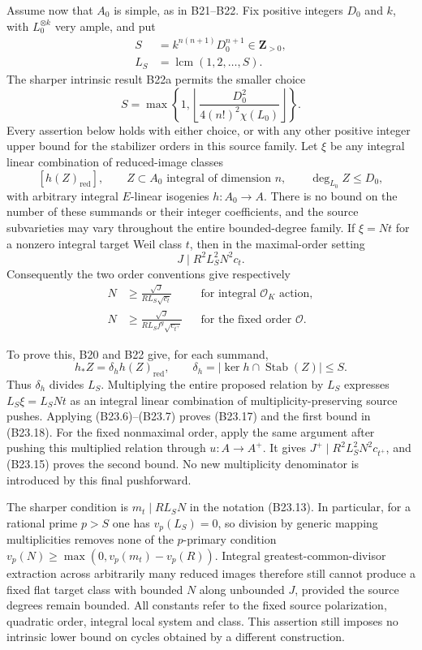 Assume now that \(A_0\) is simple, as in B21--B22. Fix positive integers \(D_0\) and \(k\), with \(L_0^{\otimes k}\) very ample, and put \[
 \begin{aligned}
 S&=k^{n(n+1)}D_0^{n+1}\in\mathbf Z_{>0},\\
 L_S&=\operatorname{lcm}(1,2,\ldots,S).
 \end{aligned}
\] The sharper intrinsic result B22a permits the smaller choice \[
 S=\max\left\{1,\left\lfloor
 \frac{D_0^2}{4(n!)^2\chi(L_0)}\right\rfloor\right\}.
\] Every assertion below holds with either choice, or with any other positive integer upper bound for the stabilizer orders in this source family. Let \(\xi\) be any integral linear combination of reduced-image classes \[
 [h(Z)_{\mathrm{red}}],
 \qquad
 Z\subset A_0\text{ integral of dimension }n,
 \qquad \deg_{L_0}Z\le D_0,
\] with arbitrary integral \(E\)-linear isogenies \(h:A_0\to A\). There is no bound on the number of these summands or their integer coefficients, and the source subvarieties may vary throughout the entire bounded-degree family. If \(\xi=Nt\) for a nonzero integral target Weil class \(t\), then in the maximal-order setting \[
 J\mid R^2L_S^2N^2c_t.
\tag{B23.17}
\] Consequently the two order conventions give respectively \[
 \begin{aligned}
 N&\ge\frac{\sqrt J}{R L_S\sqrt{c_t}}
 &&\text{for integral }\mathcal O_K\text{ action},\\
 N&\ge\frac{\sqrt J}{R L_S f^g\sqrt{c_{t^+}}}
 &&\text{for the fixed order }\mathcal O.
 \end{aligned}
\tag{B23.18}
\]

To prove this, B20 and B22 give, for each summand, \[
 h_*Z=\delta_hh(Z)_{\mathrm{red}},\qquad
 \delta_h=|\ker h\cap\operatorname{Stab}(Z)|\le S.
\] Thus \(\delta_h\) divides \(L_S\). Multiplying the entire proposed relation by \(L_S\) expresses \(L_S\xi=L_SN t\) as an integral linear combination of multiplicity-preserving source pushes. Applying (B23.6)--(B23.7) proves (B23.17) and the first bound in (B23.18). For the fixed nonmaximal order, apply the same argument after pushing this multiplied relation through \(u:A\to A^+\). It gives \(J^+\mid R^2L_S^2N^2c_{t^+}\), and (B23.15) proves the second bound. No new multiplicity denominator is introduced by this final pushforward.

The sharper condition is \(m_t\mid RL_SN\) in the notation (B23.13). In particular, for a rational prime \(p>S\) one has \(v_p(L_S)=0\), so division by generic mapping multiplicities removes none of the \(p\)-primary condition \(v_p(N)\ge\max(0,v_p(m_t)-v_p(R))\). Integral greatest-common-divisor extraction across arbitrarily many reduced images therefore still cannot produce a fixed flat target class with bounded \(N\) along unbounded \(J\), provided the source degrees remain bounded. All constants refer to the fixed source polarization, quadratic order, integral local system and class. This assertion still imposes no intrinsic lower bound on cycles obtained by a different construction.

